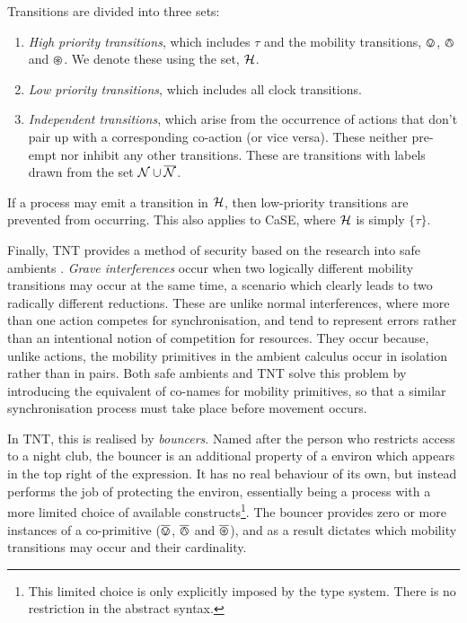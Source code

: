 \documentclass[orivec,envcountsame]{llncs}
\begin{document}
Transitions are divided into three sets:

\begin{enumerate}
\item \emph{High priority transitions}, which includes $\tau$ and
      the mobility transitions, $\varovee$, $\varowedge$ and $\varoast$.  We denote
      these using the set, $\text{$\mathcal{H}$}$.
\item \emph{Low priority transitions}, which includes all
      clock transitions.
\item \emph{Independent transitions}, which arise from the occurrence of
      actions that don't pair up with a corresponding co-action (or
      vice versa).  These neither pre-empt nor inhibit any other
      transitions.  These are transitions with labels drawn from the set
      $\text{$\mathcal{N}$} \cup \text{$\overline{\text{$\mathcal{N}$}}$}$.
\end{enumerate}

If a process may emit a transition in $\text{$\mathcal{H}$}$, then low-priority
transitions are prevented from occurring.  This also applies to CaSE,
where $\text{$\mathcal{H}$}$ is simply $\{ \tau \}$.

Finally, TNT provides a method of security based on the research into
safe ambients \cite{sangiorgi:mobsafeambients}.  \emph{Grave
interferences} occur when two logically different mobility transitions may
occur at the same time, a scenario which clearly leads to two radically
different reductions.  These are unlike normal interferences, where more
than one action competes for synchronisation, and tend to represent
errors rather than an intentional notion of competition for resources.
They occur because, unlike actions, the mobility primitives in the
ambient calculus occur in isolation rather than in pairs.  Both safe
ambients and TNT solve this problem by introducing the equivalent of
co-names for mobility primitives, so that a similar synchronisation
process must take place before movement occurs.

In TNT, this is realised by \emph{bouncers}.  Named after the person who
restricts access to a night club, the bouncer is an additional property
of a environ which appears in the top right of the expression.  It has
no real behaviour of its own, but instead performs the job of protecting
the environ, essentially being a process with a more limited choice of
available constructs\footnote{This limited choice is only explicitly
imposed by the type system.  There is no restriction in the abstract
syntax.}.  The bouncer provides zero or more instances of a co-primitive
($\overline{\varovee}$, $\overline{\varowedge}$ and $\overline{\varoast}$), and as a result dictates which mobility
transitions may occur and their cardinality.
\end{document}
